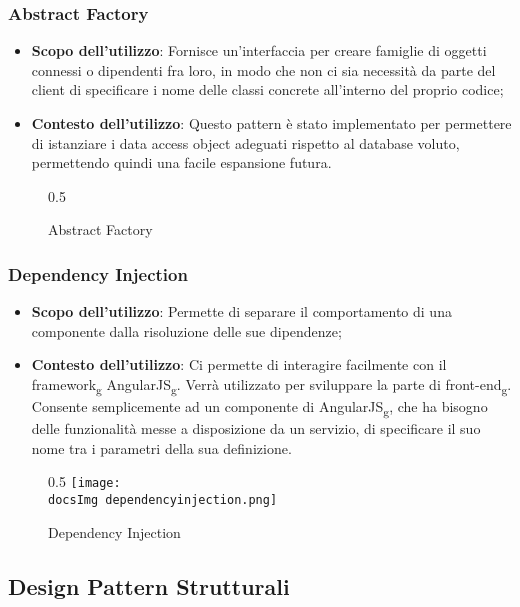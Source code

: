 		\subsubsection{Abstract Factory }
		\begin{itemize}\itemsep1pt
			\item \textbf{Scopo dell'utilizzo}: Fornisce un'interfaccia per creare famiglie di oggetti connessi o dipendenti fra loro, in modo che non ci sia necessità da parte del client di specificare i nome delle classi concrete all'interno del proprio codice;
			\item \textbf{Contesto dell'utilizzo}: Questo pattern è stato implementato per permettere di istanziare i data access object adeguati rispetto al database voluto, permettendo quindi una facile espansione futura. 
		\end{itemize}
		\begin{figure}[h]{0.5}
			\centering
			\caption{Abstract Factory}
			\label{fig. Abstract Factory}
		\end{figure}
		
		\subsubsection{Dependency Injection}
		\begin{itemize}\itemsep1pt
			\item\textbf{Scopo dell'utilizzo}: Permette di separare il comportamento di una componente dalla risoluzione delle sue dipendenze;
			\item\textbf{Contesto dell'utilizzo}: Ci permette di interagire facilmente con il framework\textsubscript{g} AngularJS\textsubscript{g}. Verrà utilizzato per sviluppare la parte di front-end\textsubscript{g}. Consente semplicemente ad un componente di AngularJS\textsubscript{g}, che ha bisogno delle funzionalità messe a disposizione da un servizio, di specificare il suo nome tra i parametri della sua definizione.
		\end{itemize}
		\begin{figure}[h]{0.5}
			\centering
			\texttt{[image: \\docsImg dependencyinjection.png]}
			\caption{Dependency Injection}
			\label{fig. Dependency Injection}
		\end{figure}

	\subsection{Design Pattern Strutturali}

